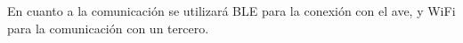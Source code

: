 En cuanto a la comunicación se utilizará BLE para la conexión con el ave, y WiFi para la comunicación con un tercero.